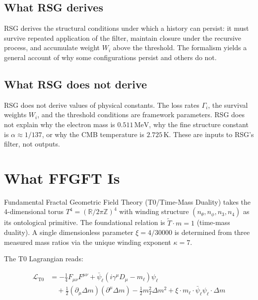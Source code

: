 \subsection{What RSG derives}

RSG derives the structural conditions under which a history can persist: it
must survive repeated application of the filter, maintain closure under the
recursive process, and accumulate weight $W_i$ above the threshold. The
formalism yields a general account of why some configurations persist and
others do not.

\subsection{What RSG does not derive}

RSG does not derive values of physical constants. The loss rates
$\Gamma_i$, the survival weights $W_i$, and the threshold conditions are
framework parameters. RSG does not explain why the electron mass is
$0.511\,\text{MeV}$, why the fine structure constant is
$\alpha \approx 1/137$, or why the CMB temperature is $2.725\,\text{K}$.
These are inputs to RSG's filter, not outputs.

\section{What FFGFT Is}

Fundamental Fractal Geometric Field Theory (T0/Time-Mass Duality) takes the
4-dimensional torus $T^4 = (\mathbb{R}/2\pi\mathbb{Z})^4$ with winding
structure $(n_\theta, n_\phi, n_3, n_4)$ as its ontological primitive.
The foundational relation is $\tilde{T} \cdot m = 1$ (time-mass duality). A
single dimensionless parameter $\xi = 4/30000$ is determined from three
measured mass ratios via the unique winding exponent $\kappa = 7$.

The T0 Lagrangian reads:

\begin{align}
  \mathcal{L}_{\text{T0}} &= -\tfrac{1}{4}F_{\mu\nu}F^{\mu\nu}
    + \bar{\psi}_\ell(i\gamma^\mu D_\mu - m_\ell)\psi_\ell \nonumber\\
    &\quad + \tfrac{1}{2}(\partial_\mu \Delta m)(\partial^\mu \Delta m)
    - \tfrac{1}{2}m_T^2 \Delta m^2
    + \xi \cdot m_\ell \cdot \bar{\psi}_\ell \psi_\ell \cdot \Delta m
\end{align}

